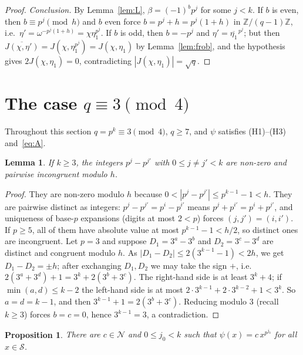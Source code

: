 \documentclass[11pt]{amsart}
\newtheorem{proposition}[theorem]{Proposition}
\newtheorem{lemma}[theorem]{Lemma}
\theoremstyle{definition}
\theoremstyle{remark}
\numberwithin{equation}{section}
\newcommand{\Sq}{\mathcal{S}}
\newcommand{\Ns}{\mathcal{N}}
\newcommand{\Z}{\mathbb{Z}}
\newcommand{\conj}[1]{\overline{#1}}
\begin{document}
\begin{proof}
\emph{Conclusion.} By Lemma~\ref{lem:L}, $\beta=(-1)^bp^j$ for some $j<k$. If $b$ is even, then $b\equiv p^j\pmod h$ and $b$ even
force $b=p^j+h=p^j(1+h)$ in $\Z/(q-1)\Z$, i.e.\ $\eta'=\omega^{-p^j(1+h)}=\chi\eta_1^{p^j}$. If $b$ is odd, then $b=-p^j$ and
$\eta'=\conj{\eta_1}^{\,p^j}$; but then $\conj{J(\chi,\eta')}=J(\chi,\eta_1^{p^j})=J(\chi,\eta_1)$ by Lemma~\ref{lem:frob}, and the
hypothesis gives $2J(\chi,\eta_1)=0$, contradicting $|J(\chi,\eta_1)|=\sqrt q$.
\end{proof}

\section{The case \texorpdfstring{$q\equiv3\pmod4$}{q = 3 (mod 4)}}\label{sec:q3}

Throughout this section $q=p^k\equiv3\pmod4$, $q\ge7$, and $\psi$ satisfies (H1)--(H3) and~\eqref{eq:A}.

\begin{lemma}\label{lem:distinct}
If $k\ge3$, the integers $p^j-p^{j'}$ with $0\le j\ne j'<k$ are non-zero and pairwise incongruent modulo $h$.
\end{lemma}

\begin{proof}
They are non-zero modulo $h$ because $0<|p^j-p^{j'}|\le p^{k-1}-1<h$. They are pairwise distinct as integers: $p^j-p^{j'}=p^i-p^{i'}$
means $p^j+p^{i'}=p^i+p^{j'}$, and uniqueness of base-$p$ expansions (digits at most $2<p$) forces $(j,j')=(i,i')$. If $p\ge5$, all
of them have absolute value at most $p^{k-1}-1<h/2$, so distinct ones are incongruent. Let $p=3$ and suppose $D_1=3^a-3^b$ and
$D_2=3^c-3^d$ are distinct and congruent modulo $h$. As $|D_1-D_2|\le2(3^{k-1}-1)<2h$, we get $D_1-D_2=\pm h$; after exchanging
$D_1,D_2$ we may take the sign $+$, i.e.\ $2(3^a+3^d)+1=3^k+2(3^b+3^c)$. The right-hand side is at least $3^k+4$; if $\min(a,d)\le k-2$
the left-hand side is at most $2\cdot3^{k-1}+2\cdot3^{k-2}+1<3^k$. So $a=d=k-1$, and then $3^{k-1}+1=2(3^b+3^c)$. Reducing modulo $3$
(recall $k\ge3$) forces $b=c=0$, hence $3^{k-1}=3$, a contradiction.
\end{proof}

\begin{proposition}\label{prop:frob}
There are $c\in\Ns$ and $0\le j_0<k$ such that $\psi(x)=c\,x^{p^{j_0}}$ for all $x\in\Sq$.
\end{proposition}
\end{document}
